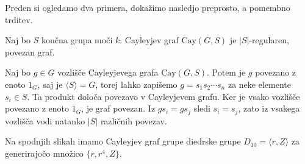Preden si ogledamo dva primera, dokažimo nasledjo preprosto, a pomembno trditev.

\begin{trditev}\label{trd_lastnosti_cayleyjevega_grafa}
    Naj bo $S$ končna grupa moči $k$. Cayleyjev graf $\text{Cay}(G, S)$ je $\lvert S \rvert$-regularen, povezan graf.
\end{trditev}
\begin{dokaz}
    Naj bo $g \in G$ vozlišče Cayleyjevega grafa $\text{Cay}(G, S)$. Potem je $g$ povezano z enoto $1_G$, saj je $\langle S \rangle = G$, torej lahko zapišemo
    $g = s_1 s_2 \cdots s_n$ za neke elemente $s_i \in S$. Ta produkt določa povezavo v Cayleyjevem grafu. Ker je vsako vozlišče povezano z enoto $1_G$, je graf povezan. Iz $g s_i = g s_j$ sledi $s_i = s_j$, zato iz vsakega vozlišča vodi natanko $\lvert S \rvert$ različnih povezav.
\end{dokaz}

\begin{primer}
Na spodnjih slikah imamo Cayleyjev graf grupe diedrske grupe $D_{10} = \langle r, Z \rangle$ za generirajočo množico $\{ r, r^4 ,Z \}$.
\begin{center}
    \end{center}
\end{primer}

